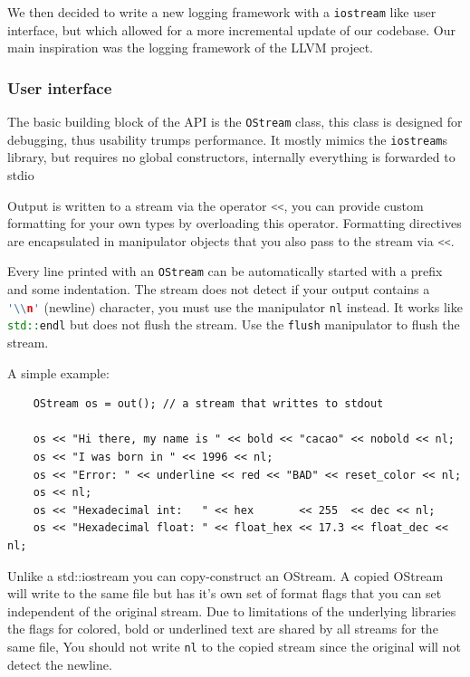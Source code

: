 \documentclass[12pt,a4paper,oneside]{article}
\newcommand{\cpp}[1]{\lstinline[language=C++]{#1}}
\begin{document}
	We then decided to write a new logging framework with a \cpp{iostream} like user interface, 
	but which allowed for a more incremental update of our codebase.
	Our main inspiration was the logging framework of the LLVM project\cite{llvm}.

\subsubsection{User interface}
	The basic building block of the API is the \cpp{OStream} class, 
	this class is designed for debugging, thus usability trumps performance.
	It mostly mimics the \cpp{iostream}s library, but requires no global constructors, 
	internally everything is forwarded to stdio

	Output is written to a stream via the operator \cpp{<<}, you can provide custom formatting 
	for your own types by overloading this operator.
	Formatting directives are encapsulated in manipulator objects that you also pass to the stream
	via \cpp{<<}.

	Every line printed with an \cpp{OStream} can be automatically started with a prefix and some indentation.
	The stream does not detect if your output contains a \cpp{'\\n'} (newline) character,
	you must use the manipulator \cpp{nl} instead. 
	It works like \cpp{std::endl} but does not flush the stream. Use the \cpp{flush} manipulator to flush the stream.

	A simple example:
		\begin{lstlisting}
	OStream os = out(); // a stream that writtes to stdout

	os << "Hi there, my name is " << bold << "cacao" << nobold << nl;
	os << "I was born in " << 1996 << nl;
	os << "Error: " << underline << red << "BAD" << reset_color << nl;
	os << nl;
	os << "Hexadecimal int:   " << hex       << 255  << dec << nl;
	os << "Hexadecimal float: " << float_hex << 17.3 << float_dec << nl;
		\end{lstlisting}

	Unlike a std::iostream you can copy-construct an OStream.
	A copied OStream will write to the same file but has it's own set of
	format flags that you can set independent of the original stream.
	Due to limitations of the underlying libraries the flags for colored, bold or underlined text are shared by all streams for the same file,
	You should not write \cpp{nl} to the copied stream since the original will not
	detect the newline.
\end{document}
